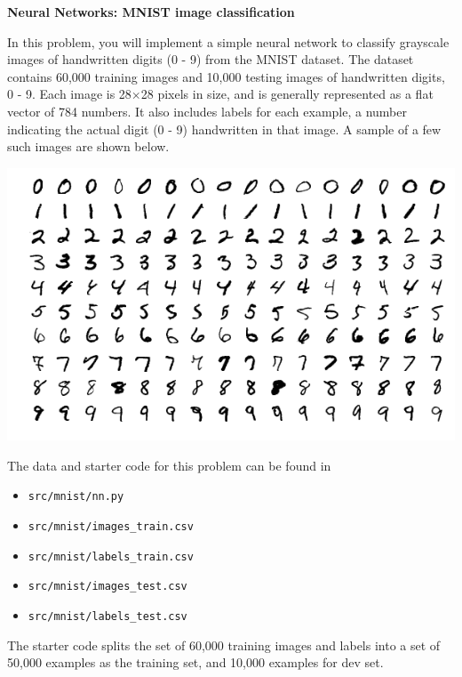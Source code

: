 \item {} {\bf Neural Networks: MNIST image classification}

In this problem, you will implement a simple neural network
to classify grayscale images of handwritten digits (0 - 9) from
the MNIST dataset. The dataset contains 60,000 training images and
10,000 testing images of handwritten digits, 0 - 9. Each image is
28$\times$28 pixels in size, and is generally represented as a flat
vector of 784 numbers. It also includes labels for each example, a number
indicating the actual digit (0 - 9) handwritten in that image. A sample of
a few such images are shown below.

\begin{center}
\includegraphics[scale=0.5]{mnist/mnist_plot}
\end{center}


The data and starter code for this problem can be found in

\begin{itemize}
\item \texttt{src/mnist/nn.py}
\item \texttt{src/mnist/images\_train.csv}
\item \texttt{src/mnist/labels\_train.csv}
\item \texttt{src/mnist/images\_test.csv}
\item \texttt{src/mnist/labels\_test.csv}
\end{itemize}

The starter code splits the set
of 60,000 training images and labels into a set of 50,000 examples as
the training set, and 10,000 examples for dev set.

